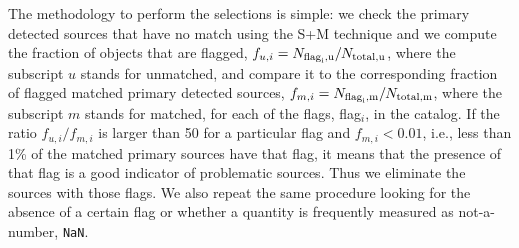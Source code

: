 \documentclass[a4paper,fleqn,usenatbib]{mnras}
\begin{document}
The methodology to perform the selections is simple: we check the primary detected sources that have no match using the \textsf{S+M} technique and we compute the fraction of objects that are flagged, $f_{u,i} = N_{\rm{flag}_{i}, u}/N_{\rm{total}, u}$, where the subscript $u$ stands for unmatched, and compare it to the corresponding fraction of flagged matched primary detected sources, $f_{m,i} = N_{\rm{flag}_{i}, m}/N_{\rm{total}, m}$, where the subscript $m$ stands for matched, for each of the flags, flag$_{i}$, in the catalog. If the ratio $f_{u,i}/f_{m,i}$ is larger than 50 for a particular flag and $f_{m,i} < 0.01$, i.e., less than 1\% of the matched primary sources have that flag, it means that the presence of that flag is a good indicator of problematic sources. Thus we eliminate the sources with those flags. We also repeat the same procedure looking for the absence of a certain flag or whether a quantity is frequently measured as not-a-number, \texttt{NaN}. 


\end{document}
